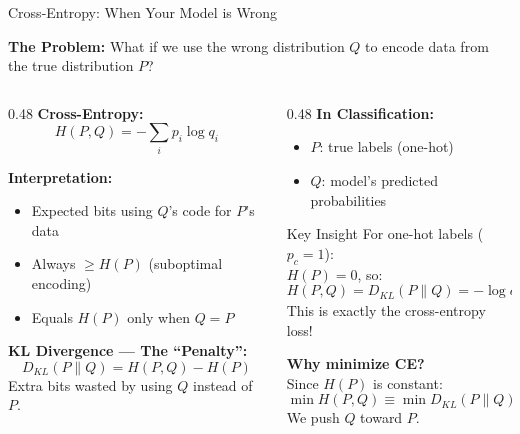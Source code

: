 \documentclass[xcolor=svgnames, 8pt, handout, standalone]{beamer}
\newcommand{\1}{\mathbf{1}}
\begin{document}
\begin{frame}{Cross-Entropy: When Your Model is Wrong}

\textbf{The Problem:} What if we use the \textcolor{rred}{wrong} distribution $Q$ to encode data from the \textcolor{jblue}{true} distribution $P$?

\pause
\vspace{0.5em}

\begin{columns}[T]
\begin{column}{0.48\textwidth}
\textbf{Cross-Entropy:}
$$H(P, Q) = -\sum_{i} p_i \log q_i$$

\pause
\textbf{Interpretation:}
\begin{itemize}
    \item Expected bits using $Q$'s code for $P$'s data
    \item Always $\geq H(P)$ (suboptimal encoding)
    \item Equals $H(P)$ only when $Q = P$
\end{itemize}

\pause
\vspace{0.3em}
\textbf{KL Divergence --- The ``Penalty'':}
$$D_{KL}(P \| Q) = H(P, Q) - H(P)$$
Extra bits wasted by using $Q$ instead of $P$.
\end{column}

\pause
\begin{column}{0.48\textwidth}
\textbf{In Classification:}
\begin{itemize}
    \item $P$: true labels (one-hot)
    \item $Q$: model's predicted probabilities
\end{itemize}

\pause
\vspace{0.3em}
\begin{alertblock}{Key Insight}
For one-hot labels ($p_c = 1$):\\[0.2em]
$H(P) = 0$, so:
$$H(P, Q) = D_{KL}(P \| Q) = -\log q_c$$
This is exactly the cross-entropy loss!
\end{alertblock}

\pause
\vspace{0.3em}
\textbf{Why minimize CE?}\\
Since $H(P)$ is constant:
$$\min H(P,Q) \equiv \min D_{KL}(P \| Q)$$
We push $Q$ toward $P$.
\end{column}
\end{columns}

\end{frame}
\end{document}
